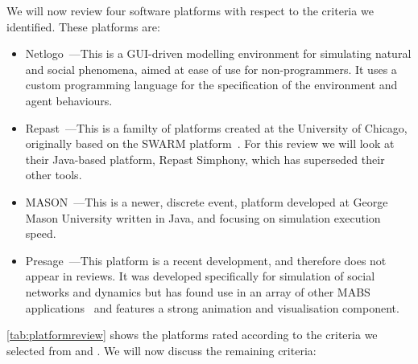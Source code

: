 We will now review four software platforms with respect to the criteria we identified. These platforms are:
\begin{itemize}
\item Netlogo~\citep{Wilensky1999a}---This is a \ac{GUI}-driven modelling environment for simulating natural and social phenomena, aimed at ease of use for non-programmers. It uses a custom programming language for the specification of the environment and agent behaviours.
\item Repast~\citep{North2013}---This is a familty of platforms created at the University of Chicago, originally based on the SWARM platform~\citep{Minar1996}. For this review we will look at their Java-based platform, Repast Simphony, which has superseded their other tools.
\item MASON~\citep{Luke2005}---This is a newer, discrete event, platform developed at George Mason University written in Java, and focusing on simulation execution speed.
\item Presage~\citep{Neville:2009}---This platform is a recent development, and therefore does not appear in reviews. It was developed specifically for simulation of social networks and dynamics but has found use in an array of other \ac{MABS} applications~\citep{Pitt2011,Carr2010} and features a strong animation and visualisation component.
\end{itemize}


\autoref{tab:platformreview} shows the platforms rated according to the criteria we selected from \citet{CynthiaNikolaiandGregoryMadey2009} and \citet{Castle2006}. We will now discuss the remaining criteria:


